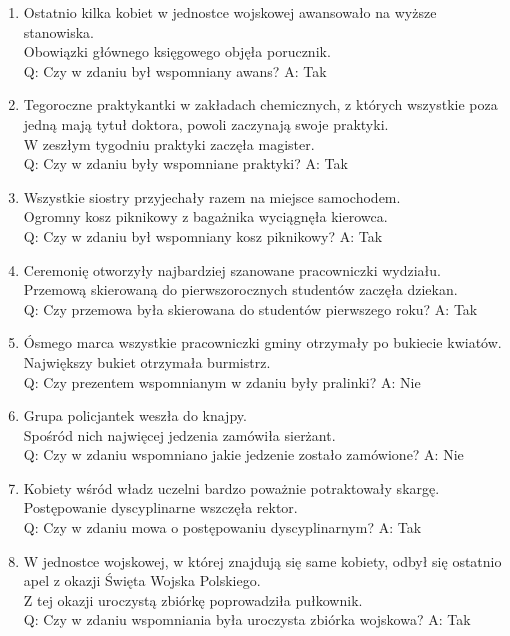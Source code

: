\begin{enumerate}
	Q: Czy w zdaniu był wspomniany wykład na temat dzików? A: Nie
\item Ostatnio kilka kobiet w jednostce wojskowej awansowało na wyższe stanowiska.\\
	Obowiązki głównego księgowego objęła porucznik.\\
	Q: Czy w zdaniu był wspomniany awans? A: Tak
\item Tegoroczne praktykantki w zakładach chemicznych, z których wszystkie poza jedną mają tytuł doktora, powoli zaczynają swoje praktyki.\\
	W zeszłym tygodniu praktyki zaczęła magister.\\
	Q: Czy w zdaniu były wspomniane praktyki? A: Tak
\item Wszystkie siostry przyjechały razem na miejsce samochodem.\\
	Ogromny kosz piknikowy z bagażnika wyciągnęła kierowca.\\
	Q: Czy w zdaniu był wspomniany kosz piknikowy? A: Tak
\item Ceremonię otworzyły najbardziej szanowane pracowniczki wydziału.\\
	Przemową skierowaną do pierwszorocznych studentów zaczęła dziekan.\\
	Q: Czy przemowa była skierowana do studentów pierwszego roku? A: Tak
\item Ósmego marca wszystkie pracowniczki gminy otrzymały po bukiecie kwiatów.\\
	Największy bukiet otrzymała burmistrz.\\
	Q: Czy prezentem wspomnianym w zdaniu były pralinki? A: Nie
\item Grupa policjantek weszła do knajpy.\\
	Spośród nich najwięcej jedzenia zamówiła sierżant.\\
	Q: Czy w zdaniu wspomniano jakie jedzenie zostało zamówione? A: Nie
\item Kobiety wśród władz uczelni bardzo poważnie potraktowały skargę.\\
	Postępowanie dyscyplinarne wszczęła rektor.\\
	Q: Czy w zdaniu mowa o postępowaniu dyscyplinarnym? A: Tak
\item W jednostce wojskowej, w której znajdują się same kobiety, odbył się ostatnio apel z okazji Święta Wojska Polskiego.\\
	Z tej okazji uroczystą zbiórkę poprowadziła pułkownik.\\
	Q: Czy w zdaniu wspomniania była uroczysta zbiórka wojskowa? A: Tak

\end{enumerate}
